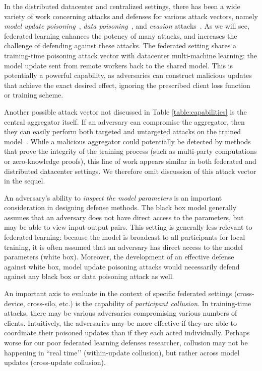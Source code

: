 In the distributed datacenter and centralized settings, there has been a wide variety of work concerning attacks and defenses for various attack vectors, namely \emph{model update poisoning}~\citep{blanchard2017machine, Chen2017DistributedSM, chen18draco, mhamdi2018hidden, alistarh2018byzantine}, \emph{data poisoning}~\citep{Biggio:2012:PAA:3042573.3042761, cretu2008casting, steinhardt2017certified, pmlr-v97-diakonikolas19a}, and \emph{evasion} attacks~\citep{biggio2013evasion, szegedy2013intriguing, goodfellow2014explaining, carlini2017towards, madry2017towards}. As we will see, federated learning enhances the potency of many attacks, and increases the challenge of defending against these attacks. The federated setting shares a training-time poisoning attack vector with datacenter multi-machine learning: the model update sent from remote workers back to the shared model. This is potentially a powerful capability, as adversaries can construct malicious updates that achieve the exact desired effect, ignoring the prescribed client loss function or training scheme.

Another possible attack vector not discussed in Table \ref{table:capabilities} is the central aggregator itself. If an adversary can compromise the aggregator, then they can easily perform both targeted and untargeted attacks on the trained model~\citep{DBLP:conf/ndss/LiuMALZW018}. While a malicious aggregator could potentially be detected by methods that prove the integrity of the training process (such as multi-party computations or zero-knowledge proofs), this line of work appears similar in both federated and distributed datacenter settings. We therefore omit discussion of this attack vector in the sequel.

An adversary's ability to \emph{inspect the model parameters} is an important consideration in designing defense methods. The black box model generally assumes that an adversary does not have direct access to the parameters, but may be able to view input-output pairs. This setting is generally less relevant to federated learning: because the model is broadcast to all participants for local training, it is often assumed that an adversary has direct access to the model parameters (white box). Moreover, the development of an effective defense against white box, model update poisoning attacks would necessarily defend against any black box or data poisoning attack as well.

An important axis to evaluate in the context of specific federated settings (cross-device, cross-silo, etc.) is the capability of \emph{participant collusion}. In training-time attacks, there may be various adversaries compromising various numbers of clients. Intuitively, the adversaries may be more effective if they are able to coordinate their poisoned updates than if they each acted individually. Perhaps worse for our poor federated learning defenses researcher, collusion may not be happening in ``real time’’ (within-update collusion), but rather across model updates (cross-update collusion). 

